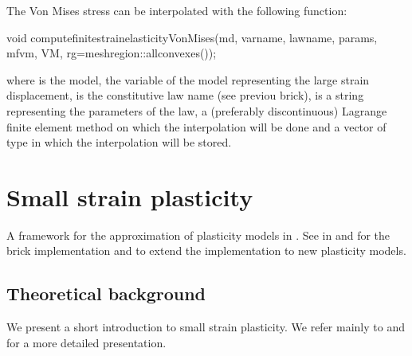 \documentclass[a4paper,11pt,english]{sphinxmanual}
\begin{document}
The Von Mises stress can be interpolated with the following function:

\begin{sphinxVerbatim}[commandchars=\\\{\}]
void compute\PYGZus{}finite\PYGZus{}strain\PYGZus{}elasticity\PYGZus{}Von\PYGZus{}Mises(md, varname, lawname, params, mf\PYGZus{}vm, VM,
                                                rg=mesh\PYGZus{}region::all\PYGZus{}convexes());
\end{sphinxVerbatim}

where  is the model,  the variable of the model representing the large strain displacement,  is the constitutive law name (see previou brick),  is a string representing the parameters of the law,  a (preferably discontinuous) Lagrange  finite element method on which the interpolation will be done and  a vector of type  in which the interpolation will be stored.

\ignorespaces 

\chapter{Small strain plasticity}
\label{\detokenize{userdoc/model_plasticity_small_strain:small-strain-plasticity}}\label{\detokenize{userdoc/model_plasticity_small_strain:ud-model-plasticity-small-strain}}\label{\detokenize{userdoc/model_plasticity_small_strain:index-0}}\label{\detokenize{userdoc/model_plasticity_small_strain::doc}}
A framework for the approximation of plasticity models in . See in  and  for the brick implementation and to extend the implementation to new plasticity models.


\section{Theoretical background}
\label{\detokenize{userdoc/model_plasticity_small_strain:theoretical-background}}
We present a short introduction to small strain plasticity. We refer mainly to  and  for a more detailed presentation.
\end{document}
